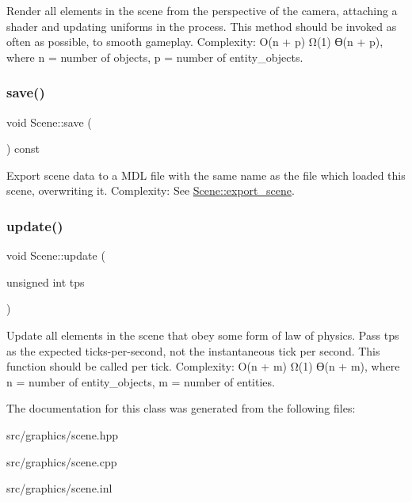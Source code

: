 Render all elements in the scene from the perspective of the camera, attaching a shader and updating uniforms in the process. This method should be invoked as often as possible, to smooth gameplay. Complexity\+: O(n + p) Ω(1) ϴ(n + p), where n = number of objects, p = number of entity\+\_\+objects. \mbox{\label{class_scene_a6063cdee2eaaf56fd8bf91ba961007f4}} 
\subsubsection{\texorpdfstring{save()}{save()}}
{\footnotesize\ttfamily void Scene\+::save (\begin{DoxyParamCaption}{ }\end{DoxyParamCaption}) const}

Export scene data to a M\+DL file with the same name as the file which loaded this scene, overwriting it. Complexity\+: See \mbox{\hyperlink{class_scene_a65b10c0a127b5f811869a605b70c5a72}{Scene\+::export\+\_\+scene}}. \mbox{\label{class_scene_a48cd0277ef22f45849ff2ceefddf6d25}} 
\subsubsection{\texorpdfstring{update()}{update()}}
{\footnotesize\ttfamily void Scene\+::update (\begin{DoxyParamCaption}\item[{unsigned int}]{tps }\end{DoxyParamCaption})}

Update all elements in the scene that obey some form of law of physics. Pass tps as the expected ticks-\/per-\/second, not the instantaneous tick per second. This function should be called per \textquotesingle{}tick\textquotesingle{}. Complexity\+: O(n + m) Ω(1) ϴ(n + m), where n = number of entity\+\_\+objects, m = number of entities. 

The documentation for this class was generated from the following files\+:\begin{DoxyCompactItemize}
\item 
src/graphics/scene.\+hpp\item 
src/graphics/scene.\+cpp\item 
src/graphics/scene.\+inl\end{DoxyCompactItemize}
